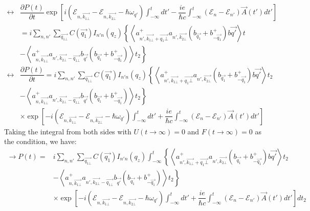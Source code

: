 \documentclass{article}
\begin{document}
\begin{align*}
        \leftrightarrow &\dfrac{\partial P(t)}{\partial t} \exp \left[i \left(\mathcal{E}_{n,\vec{k_{1\bot}}}- \mathcal{E}_{n,\vec{k_{2\bot}}}-\hbar\omega_{q'}\right) \int^t_{-\infty}dt'- \dfrac{ie}{\hbar c} \int^t_{-\infty}\left(\mathcal{E}_n -\mathcal{E}_{n'}\right)\vec{A}(t')dt'\right] \\
        & = i \sum_{n,n'}\sum_{\vec{q_{1\bot}}} C \left(\vec{q_1}\right) I_{n'n} \left(q_z\right) \left\{\left\langle a^+_{n',\vec{k_{1\bot}}+\vec{q_1\bot}}a_{n',\vec{k_{2\bot}}}\left(b_{\vec{q_1}}+b^+_{-\vec{q_1}}\right)b\vec{q'}\right\rangle t \right. \\
   & \left. - \left\langle  a^+_{n,\vec{k_{1\bot}}} a_{n',\vec{k_{2\bot}}-\vec{q_{1\bot}}}b_{\vec{q'}}\left(b_{\vec{q_1}}+ b^+_{-\vec{q_1}}\right)\right\rangle t_2\right\} \\
   \leftrightarrow & \dfrac{\partial P(t)}{\partial t} = i \sum_{n,n'}\sum_{\vec{q_{1\bot}}} C \left(\vec{q_1}\right) I_{n'n} \left(q_z\right) \left\{\left\langle a^+_{n',\vec{k_{1\bot}}+\vec{q_1\bot}}a_{n',\vec{k_{2\bot}}}\left(b_{\vec{q_1}}+b^+_{-\vec{q_1}}\right)b\vec{q'}\right\rangle t_2 \right. \\
   & \left. - \left\langle  a^+_{n,\vec{k_{1\bot}}} a_{n',\vec{k_{2\bot}}-\vec{q_{1\bot}}}b_{\vec{q'}}\left(b_{\vec{q_1}}+ b^+_{-\vec{q_1}}\right)\right\rangle t_2\right\} \\
   & \times \exp \left[-i \left(\mathcal{E}_{n,\vec{k_{1\bot}}}- \mathcal{E}_{n,\vec{k_{2\bot}}}-\hbar\omega_{q'}\right) \int^t_{-\infty}dt'+ \dfrac{ie}{\hbar c} \int^t_{-\infty}\left(\mathcal{E}_n -\mathcal{E}_{n'}\right)\vec{A}(t')dt'\right]
\end{align*}
Taking the integral from both sides with $U(t \to \infty)=0$ and $F(t\to \infty) = 0$ as the condition, we have:
\begin{align*}
   \rightarrow P(t) = & i \sum_{n,n'}\sum_{\vec{q_{1\bot}}} C \left(\vec{q_1}\right) I_{n'n} \left(q_z\right)\int^t_{-\infty} \left\{\left\langle a^+_{n',\vec{k_{1\bot}}+\vec{q_1\bot}}a_{n',\vec{k_{2\bot}}}\left(b_{\vec{q_1}}+b^+_{-\vec{q_1}}\right)b\vec{q'}\right\rangle t_2 \right. \\
   & \left. - \left\langle  a^+_{n,\vec{k_{1\bot}}} a_{n',\vec{k_{2\bot}}-\vec{q_{1\bot}}}b_{\vec{q'}}\left(b_{\vec{q_1}}+ b^+_{-\vec{q_1}}\right)\right\rangle t_2\right\} \\
   & \times \exp \left[-i \left(\mathcal{E}_{n,\vec{k_{1\bot}}}- \mathcal{E}_{n,\vec{k_{2\bot}}}-\hbar\omega_{q'}\right) \int^t_{-\infty}dt'+ \dfrac{ie}{\hbar c} \int^t_{-\infty}\left(\mathcal{E}_n -\mathcal{E}_{n'}\right)\vec{A}(t')dt'\right]dt_2
\end{align*}
\end{document}
